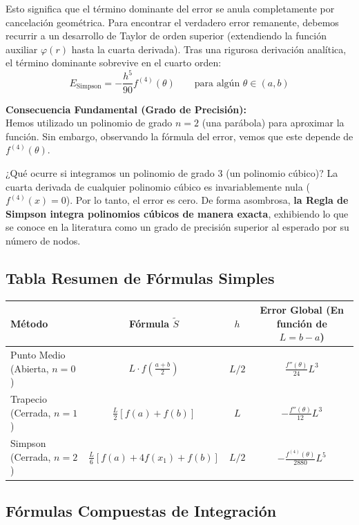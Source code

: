 Esto significa que el término dominante del error se anula completamente por cancelación geométrica. Para encontrar el verdadero error remanente, debemos recurrir a un desarrollo de Taylor de orden superior (extendiendo la función auxiliar $\varphi(r)$ hasta la cuarta derivada). Tras una rigurosa derivación analítica, el término dominante sobrevive en el cuarto orden:
\[
    E_{\text{Simpson}} = \boxed{-\frac{h^5}{90} f^{(4)}(\theta)} \qquad \text{para algún } \theta \in (a,b)
\]

\textbf{Consecuencia Fundamental (Grado de Precisión):}\\
Hemos utilizado un polinomio de grado $n=2$ (una parábola) para aproximar la función. Sin embargo, observando la fórmula del error, vemos que este depende de $f^{(4)}(\theta)$. 

¿Qué ocurre si integramos un polinomio de grado 3 (un polinomio cúbico)? La cuarta derivada de cualquier polinomio cúbico es invariablemente nula ($f^{(4)}(x) = 0$). Por lo tanto, el error es cero. 
De forma asombrosa, \textbf{la Regla de Simpson integra polinomios cúbicos de manera exacta}, exhibiendo lo que se conoce en la literatura como un grado de precisión superior al esperado por su número de nodos.

\subsection{Tabla Resumen de Fórmulas Simples}

\begin{center}
    \renewcommand{\arraystretch}{1.8}
    \begin{tabular}{|l|c|c|c|}
        \hline
        \textbf{Método} & \textbf{Fórmula $\widetilde{S}$} & $h$ & \textbf{Error Global (En función de $L = b-a$)} \\
        \hline
        Punto Medio (Abierta, $n=0$) & $L \cdot f(\frac{a+b}{2})$ & $L/2$ & $\frac{f''(\theta)}{24} L^3$ \\
        \hline
        Trapecio (Cerrada, $n=1$) & $\frac{L}{2} [f(a) + f(b)]$ & $L$ & $-\frac{f''(\theta)}{12} L^3$ \\
        \hline
        Simpson (Cerrada, $n=2$) & $\frac{L}{6} [f(a) + 4f(x_1) + f(b)]$ & $L/2$ & $-\frac{f^{(4)}(\theta)}{2880} L^5$ \\
        \hline
    \end{tabular}
\end{center}
\subsection{Fórmulas Compuestas de Integración}


